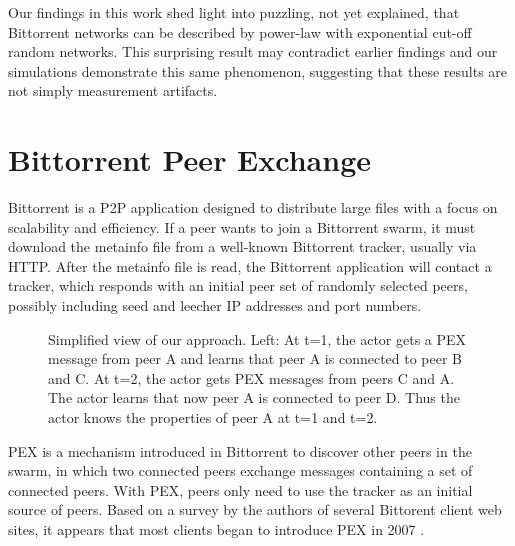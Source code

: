 \documentclass[10pt,conference,letterpaper]{IEEEtran}
\begin{document}
Our findings in this work shed light into puzzling, not yet explained, that  Bittorrent networks can be described by power-law with exponential cut-off random networks.
This surprising result may contradict earlier findings and our simulations demonstrate this same phenomenon, suggesting that these results are not simply measurement artifacts.

\section{Bittorrent Peer Exchange}\label{background}
Bittorrent is a P2P application designed to distribute large files with a focus on scalability and efficiency.  
If a peer wants to join a Bittorrent swarm, it must download the metainfo file from a well-known Bittorrent tracker, usually via HTTP. 
After the metainfo file is read, the Bittorrent application will contact a tracker, which responds with an initial peer set of randomly selected peers, possibly including seed and leecher IP addresses and port numbers.  

\begin{figure}
\centering
{}
\caption{Simplified view of our approach. Left: At t=1, the actor gets a PEX message from peer A and
learns that peer A is connected to peer B and C. At t=2, the actor gets  PEX messages from peers C and A. The actor
learns that now peer A is connected to peer D. Thus the actor knows the properties of peer A at t=1 and t=2.} 
\label{fig:pexworks}
\vspace{-5mm}
\end{figure}

PEX is a mechanism introduced in Bittorrent to discover other peers in the swarm, in which two connected peers exchange messages containing a set of connected peers.  
With PEX, peers only need to use the tracker as an initial source of peers.   
Based on a survey by the authors of several Bittorent client web sites, it appears that most clients began to introduce PEX in 2007 \cite{client}.
\end{document}
